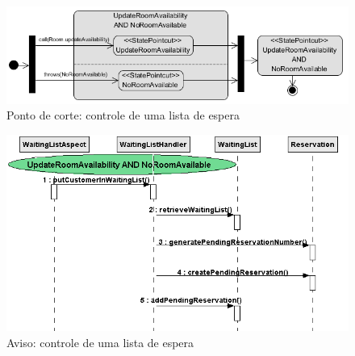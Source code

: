  \begin{figure}[tb]
	\centering
	\includegraphics[scale=0.8]{img/case_study_behavioral_pointcut_waiting_list.png}
	\caption{Ponto de corte: controle de uma lista de espera}\label{fig:case_study_behavioral_pointcut_waiting_list}
  \end{figure}
  
  \begin{figure}
	\centering
	\includegraphics{img/case_study_behavioral_waiting_list.png}
	\caption{Aviso: controle de uma lista de espera}\label{fig:case_study_behavioral_waiting_list}
  \end{figure}
  
